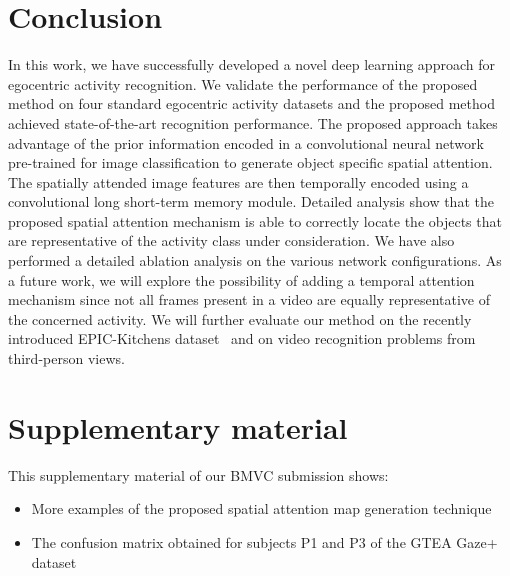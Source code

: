 \documentclass{bmvc2k}
\newcommand{\rev}[2]{#2}
\begin{document}
\section{Conclusion}
\label{sec:conc}

In this work, we have successfully developed a novel deep learning approach for egocentric activity recognition. We validate the performance of the proposed method on four standard egocentric activity datasets and the proposed method achieved state-of-the-art recognition performance. The proposed approach takes advantage of the prior information encoded in a convolutional neural network pre-trained for image classification to generate object specific spatial attention. The spatially attended image features are then temporally encoded using a convolutional long short-term memory module. Detailed analysis show that the proposed spatial attention mechanism is able to correctly locate the objects that are representative of the activity class under consideration. We have also performed a detailed ablation analysis on the various network configurations. As a future work, we will explore the possibility of adding a temporal attention mechanism since not all frames present in a video are equally representative of the concerned activity. \rev{}{We will further evaluate our method on the recently introduced EPIC-Kitchens dataset~\cite{Damen2018EPICKITCHENS} and on video recognition problems from third-person views}.





\newpage

\section*{Supplementary material}

This supplementary material of our BMVC submission shows: 
\begin{itemize}
	\item More examples of the proposed spatial attention map generation technique
	\item The confusion matrix obtained for subjects P1 and P3 of the GTEA Gaze+ dataset
\end{itemize} 
\end{document}
